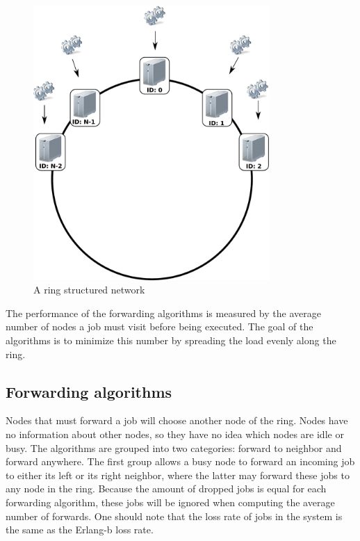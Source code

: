 \documentclass[10pt,a4paper]{article}
\begin{document}
\begin{figure}[h!tb]
\centering
\includegraphics[width=0.8\textwidth,clip=true,trim=0px 225px 0px 0px]{resources/drawing.pdf}
\caption{A ring structured network}
\label{figring}
\end{figure}

The performance of the forwarding algorithms is measured by the average number of nodes a job must visit before being executed. The goal of the algorithms is to minimize this number by spreading the load evenly along the ring. 

\subsection{Forwarding algorithms}
Nodes that must forward a job will choose another node of the ring. Nodes have no information about other nodes, so they have no idea which nodes are idle or busy. The algorithms are grouped into two categories: forward to neighbor and forward anywhere.
The first group allows a busy node to forward an incoming job to either its left or its right neighbor, where the latter may forward these jobs to any node in the ring. 
Because the amount of dropped jobs is equal for each forwarding algorithm, these jobs will be ignored when computing the average number of forwards. One should note that the loss rate of jobs in the system is the same as the Erlang-b loss rate.
\end{document}
